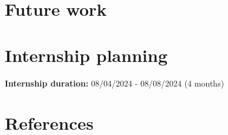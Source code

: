 \documentclass[
  oneside,
  open=any]{scrbook}
\begin{document}
\chapter{Future work}\label{future-work}

\chapter{Internship planning}\label{internship-planning}

\textbf{Internship duration:} 08/04/2024 - 08/08/2024 (4 months)

\chapter{References}\label{references}

\label{refs}
\end{document}
